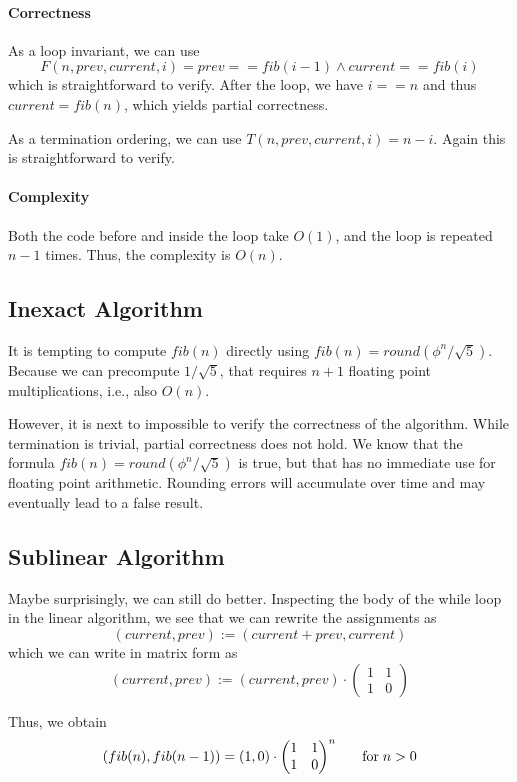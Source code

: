 \paragraph{Correctness}
As a loop invariant, we can use
\[F(n,prev,current,i) = prev==fib(i-1)\wedge current==fib(i)\]
which is straightforward to verify.
After the loop, we have $i==n$ and thus $current=fib(n)$, which yields partial correctness.

As a termination ordering, we can use $T(n,prev,current,i)=n-i$.
Again this is straightforward to verify.

\paragraph{Complexity}
Both the code before and inside the loop take $O(1)$, and the loop is repeated $n-1$ times.
Thus, the complexity is $O(n)$.

\subsection{Inexact Algorithm}\label{sec:ad:fib:inexact}

It is tempting to compute $fib(n)$ directly using $fib(n)=round(\phi^n/\sqrt{5})$.
Because we can precompute $1/\sqrt{5}$, that requires $n+1$ floating point multiplications, i.e., also $O(n)$.

However, it is next to impossible to verify the correctness of the algorithm. While termination is trivial, partial correctness does not hold.
We know that the formula $fib(n)=round(\phi^n/\sqrt{5})$ is true, but that has no immediate use for floating point arithmetic.
Rounding errors will accumulate over time and may eventually lead to a false result.

\subsection{Sublinear Algorithm}\label{sec:ad:fib:sublinear}

Maybe surprisingly, we can still do better.
Inspecting the body of the while loop in the linear algorithm, we see that we can rewrite the assignments as
\[(current,prev):=(current+prev, current)\]
which we can write in matrix form as
\[(current,prev):=(current,prev)\cdot\begin{pmatrix}1&1\\1&0\end{pmatrix}\]

Thus, we obtain
\[(fib(n),fib(n-1))= (1,0)\cdot\begin{pmatrix}1&1\\1&0\end{pmatrix}^n \hspace*{.5cm}\;\mathrm{for}\; n>0\]

